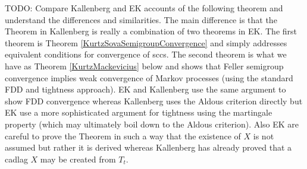 TODO: Compare Kallenberg and EK accounts of the following theorem and understand the differences and similarities.  The main difference is that the Theorem in Kallenberg is really
a combination of two theorems in EK.  The first theorem is Theorem \ref{KurtzSovaSemigroupConvergence} and simply addresses equivalent conditions for convergence of sccs.  The second theorem is what we have as Theorem \ref{KurtzMackevicius} below and shows that Feller semigroup convergence implies weak convergence of Markov processes (using the standard FDD and tightness approach).  EK and Kallenberg use the same argument to show FDD convergence whereas Kallenberg uses the Aldous criterion directly but EK use a more sophisticated argument for tightness using the martingale property (which may ultimately boil down to the Aldous criterion).  Also EK are careful to prove the Theorem in such a way that the existence of $X$ is not assumed but rather it is derived whereas Kallenberg has already proved that a cadlag $X$ may be created from $T_t$.

